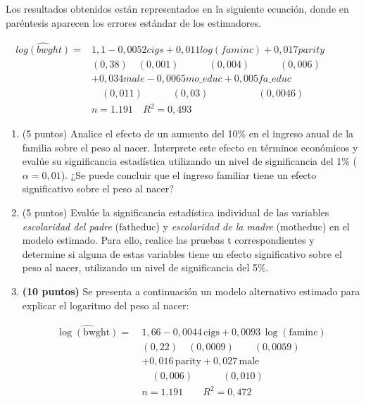 \documentclass{article} %
\begin{document}
{\begin{enumerate}
Los resultados obtenidos están representados en la siguiente ecuación, donde en paréntesis aparecen los errores estándar de los estimadores.
    

\begin{equation*}
\begin{array}{ll}
\widehat{log(bwght)}  = & 1,1 -0,0052 cigs+0,011 log( faminc) +0,017 parity\\
& (0,38) \quad (0, 001) \quad \quad \quad (0,004)\quad \quad \quad   (0,006) \quad \quad \quad\\
&+0,034 male-0,0065mo\_educ +0,005fa\_educ\\
&\quad (0,011)\quad \quad \quad (0,03)\quad \quad \quad \quad \quad (0,0046)\\
 & n =1.191 \quad R^2=  0,493
\end{array}
\end{equation*}


\begin{enumerate}
    
    \item (5 puntos) Analice el efecto de un aumento del 10\% en el ingreso anual de la familia sobre el  peso al nacer. Interprete este efecto en términos económicos y evalúe su significancia estadística utilizando un nivel de significancia del 1\% (\( \alpha = 0{,}01 \)). ¿Se puede concluir que el ingreso familiar tiene un efecto significativo sobre el peso al nacer?

    \item (5 puntos) Evalúe la significancia estadística individual de las variables \textit{escolaridad del padre} (\( \text{fatheduc} \)) y \textit{escolaridad de la madre} (\( \text{motheduc} \)) en el modelo estimado. Para ello, realice las pruebas t correspondientes y determine si alguna de estas variables tiene un efecto significativo sobre el peso al nacer, utilizando un nivel de significancia del 5\%.

    \item \textbf{(10 puntos)} Se presenta a continuación un modelo alternativo estimado para explicar el logaritmo del peso al nacer:

    \begin{equation*}
    \begin{aligned}
    \widehat{\log(\text{bwght})} =\ & 1{,}66 - 0{,}0044\, \text{cigs} + 0{,}0093\, \log(\text{faminc})\\
    & (0{,}22) \quad (0{,}0009) \quad \quad (0{,}0059) \quad \\
     &+ 0{,}016\, \text{parity} + 0{,}027\, \text{male} \\
     &\quad (0{,}006) \quad \quad \quad (0{,}010) \\
    & n = 1.191 \quad \quad R^2 = 0{,}472
    \end{aligned}
    \end{equation*}


\end{enumerate}
\end{enumerate}}
\end{document}
